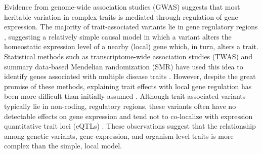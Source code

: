 \documentclass[
]{article}
\begin{document}
Evidence from genome-wide association studies (GWAS) suggests that most
heritable variation in complex traits is mediated through regulation of
gene expression. The majority of trait-associated variants lie in gene
regulatory regions
\cite{pmid22955828, pmid25363779, pmid21617055, pmid19474294, 
pmid24702953, pmid24316577, pmid27126046}, suggesting a relatively
simple causal model in which a variant alters the homeostatic expression
level of a nearby (local) gene which, in turn, alters a trait.
Statistical methods such as transcriptome-wide association studies
(TWAS) \cite{pmid33020666, pmid26258848, pmid27019110, pmid26854917} and
summary data-based Mendelian randomization (SMR) \cite{pmid27019110}
have used this idea to identify genes associated with multiple disease
traits \cite{pmid29567659, 
pmid35533209,  pmid27309819, pmid30950127}. However, despite the great
promise of these methods, explaining trait effects with local gene
regulation has been more difficult than initially assumed
\cite{pmid32912663, pmid36515579}. Although trait-associated variants
typically lie in non-coding, regulatory regions, these variants often
have no detectable effects on gene expression \cite{pmid32912663} and
tend not to co-localize with expression quantitative trait loci (eQTLs)
\cite{pmid36515579, pmid37857933}. These observations suggest that the
relationship among genetic variants, gene expression, and organism-level
traits is more complex than the simple, local model.
\end{document}
